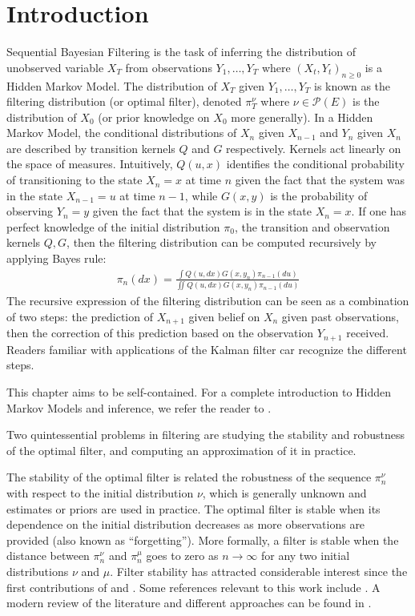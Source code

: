 \section{Introduction}

Sequential Bayesian Filtering is the task of inferring the distribution of unobserved variable $X_T$ from observations $Y_1, \ldots, Y_T$ where $(X_t, Y_t)_{n \geq 0}$ is a Hidden Markov Model. The distribution of $X_T$ given $Y_1, \ldots, Y_T$ is known as the filtering distribution (or optimal filter), denoted $\pi_T^\nu$ where $\nu\in\mathcal P(E)$ is the distribution of $X_0$ (or prior knowledge on $X_0$ more generally). In a Hidden Markov Model, the conditional distributions of $X_n$ given $X_{n-1}$ and $Y_n$ given $X_n$ are described by transition kernels $Q$ and $G$ respectively. Kernels act linearly on the space of measures. Intuitively, $Q(u,x)$ identifies the conditional probability of transitioning to the state $X_{n}=x$ at time $n$ given the fact that the system was in the state $X_{n-1}=u$ at time $n-1$, while $G(x,y)$ is the probability of observing $Y_{n} = y$ given the fact that the system is in the state $X_{n} = x$. If one has perfect knowledge of the initial distribution $\pi_0$, the transition and observation kernels $Q, G$, then the filtering distribution can be computed recursively by applying Bayes rule:
\begin{align}\label{eq:bayes-0}
\pi_n(dx) = \frac{\int Q(u, dx)G(x, y_n)\pi_{n-1}(du)}{\iint Q(u, dx)G(x, y_n)\pi_{n-1}(du)}
\end{align}
The recursive expression of the filtering distribution can be seen as a combination of two steps: the prediction of $X_{n+1}$ given belief on $X_n$ given past observations, then the correction of this prediction based on the observation $Y_{n+1}$ received. Readers familiar with applications of the Kalman filter car recognize the different steps.

This chapter aims to be self-contained. For a complete introduction to Hidden Markov Models and inference, we refer the reader to \cite{cappehmm}.

Two quintessential problems in filtering are studying the stability and robustness of the optimal filter, and computing an approximation of it in practice.

The stability of the optimal filter is related the robustness of the sequence $\pi_n^\nu$ with respect to the initial distribution $\nu$, which is generally unknown and estimates or priors are used in practice. The optimal filter is stable when its dependence on the initial distribution decreases as more observations are provided (also known as ``forgetting''). More formally, a filter is stable when the distance between $\pi_n^\nu$ and $\pi_n^\mu$ goes to zero as $n\to\infty$ for any two initial distributions $\nu$ and $\mu$. Filter stability has attracted considerable interest since the first contributions of \cite{ocone} and \cite{kunita}. Some references relevant to this work include \cite{oudjane,mcdonald2020,legland99,decastro2017,mitrophanov-hmm-stability-2005}.
A modern review of the literature and different approaches can be found in \cite{kim2022duality}.


